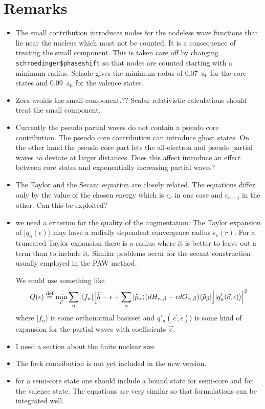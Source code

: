 \documentclass[11pt,a4paper]{report}
\begin{document}
\chapter{Remarks}
\begin{itemize}
\item The small contribution introduces nodes for the nodeless wave
  functions that lie near the nucleus which must not be counted. It is
  a consequence of treating the small component. This is taken care
  off by changing \verb|schroedinger$phaseshift| so that nodes are
  counted starting with a minimum radius. Schade\cite{schade12_thesis}
  gives the minimum radus of 0.07~a$_0$ for the core states and
  0.09~a$_0$ for the valence states.
%
\item Zora avoids the small component.?? Scalar relativistic
  calculations should treat the small component.
%
\item Currently the pseudo partial waves do not contain a pseudo core
  contribution. The pseudo core contribution can introduce ghost
  states.  On the other hand the pseudo core part lets the
  all-electron and pseudo partial waves to deviate at larger
  distances. Does this affect introduce an effect between core states
  and exponentially increasing partial waves?
%
\item The Taylor and the Secant equation are closely related. The
  equations differ only by the value of the chosen energy which is
  $\epsilon_\nu$ in one case and $\epsilon_{n+j}$ in the other. Can
  this be exploited?
%
\item we need a criterion for the quality of the augmentation: The
  Taylor expansion of $|q_n(\epsilon)\rangle$ may have a radially
  dependent convergence radius $\epsilon_c(r)$. For a truncated Taylor
  expansion there is a radius where it is better to leave out a term
  than to include it. Similar problems occur for the secant
  construction usually employed in the PAW method.

  We could use something like
  \begin{eqnarray}
  Q(\epsilon)\stackrel{\text{def}}{=}\min_{\vec{c}}
\sum_n\Bigl|\langle f_n|\Bigl[\tilde{h}-\epsilon+
\sum_\alpha|\tilde{p}_\alpha\rangle(dH_{\alpha,\beta}-\epsilon dO_{\alpha,\beta})
\langle\tilde{p}_\beta|\Bigr]|q'_n(\vec{c},\epsilon)\rangle\Bigr|^2
  \end{eqnarray}
  where $|f_n\rangle$ is some orthonormal basisset and
  $q'_n(\vec{c},\epsilon)\rangle$ is some kind of expansion for the
  partial waves with coefficients $\vec{c}$.
%
\item I need a section about the finite nuclear size
%
\item The fock contribution is not yet included in the new version.
%
\item for a semi-core state one should include a bound state for
  semi-core and for the valence state. The equations are very similar
  so that formulations can be integrated well. 
%
\end{itemize}
\end{document}
